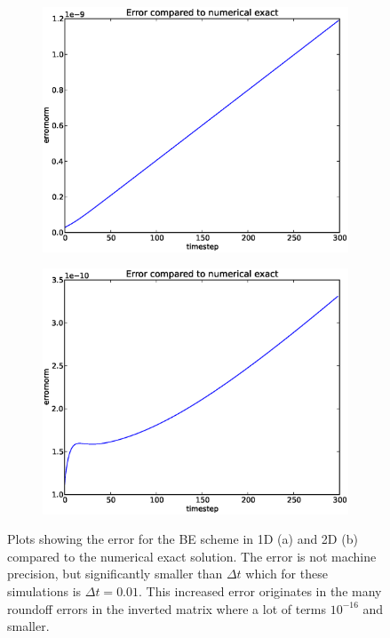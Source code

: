 \begin{figure}[H]
 \centering
 \begin{subfigure}{0.49\textwidth}
 \includegraphics[width=\textwidth]{../results/experiment_14042014_0759_BE1D_numerical_exact/results/numerical_exact.eps}
 \caption{}
\end{subfigure}
\begin{subfigure}{0.49\textwidth}
 \includegraphics[width=\textwidth]{../results/experiment_30042014_0914_BE2D_numex/results/numerical_exact.eps}
 \caption{}
\end{subfigure}
 \caption[Numerical exact errorplots for BE scheme]{Plots showing the error for the BE scheme in 1D (a) and 2D (b) compared to the numerical exact solution. 
 The error is not machine precision, but significantly smaller than $\Delta t$ which for these simulations is $\Delta t=0.01$. 
 This increased error originates in the many roundoff errors in the inverted matrix where a lot of terms $10^{-16}$ and smaller.}
 \label{numex:BE_errorplot}
\end{figure}
